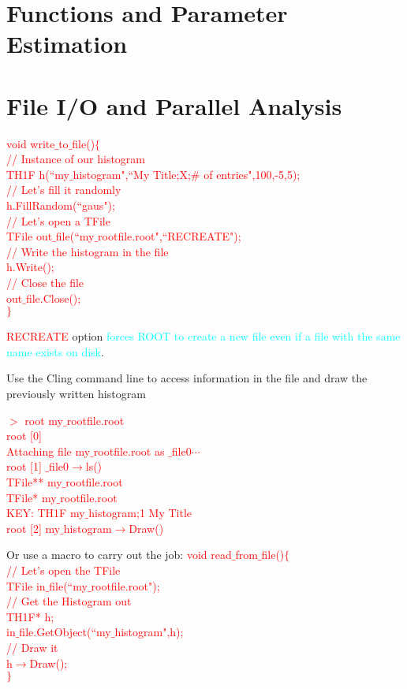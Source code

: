 \documentclass[12pt,a4paper]{article}
\begin{document}
\section{Functions and Parameter Estimation}

\section{File I/O and Parallel Analysis}

\textcolor{red}{
void write$\_$to$\_$file()$\{$ \\
// Instance of our histogram \\
TH1F h(``my$\_$histogram",``My Title;X;$\#$ of entries",100,-5,5); \\
// Let's fill it randomly \\
h.FillRandom(``gaus"); \\
// Let's open a TFile \\
TFile out$\_$file(``my$\_$rootfile.root",``RECREATE"); \\
// Write the histogram in the file \\
h.Write(); \\
// Close the file \\
out$\_$file.Close(); \\
$\}$
}

\textcolor{red}{RECREATE} option \textcolor{cyan}{forces ROOT to create a new file even if a file with the same name exists on disk}.

Use the Cling command line to access information in the file and draw the previously written histogram

\textcolor{red}{
$>$ root my$\_$rootfile.root \\
root [0] \\
Attaching file my$\_$rootfile.root as $\_$file0$\cdots$ \\
root [1] $\_$file0$\rightarrow$ls() \\
TFile** my$\_$rootfile.root \\
TFile* my$\_$rootfile.root \\
KEY: TH1F my$\_$histogram;1 My Title \\
root [2] my$\_$histogram$\rightarrow$Draw() 
}

Or use a macro to carry out the job:
\textcolor{red}{
void read$\_$from$\_$file()$\{$ \\
// Let's open the TFile \\
TFile in$\_$file(``my$\_$rootfile.root"); \\
// Get the Histogram out \\
TH1F* h; \\
in$\_$file.GetObject(``my$\_$histogram",h); \\
// Draw it \\
h$\rightarrow$Draw(); \\
$\}$
}
\end{document}

